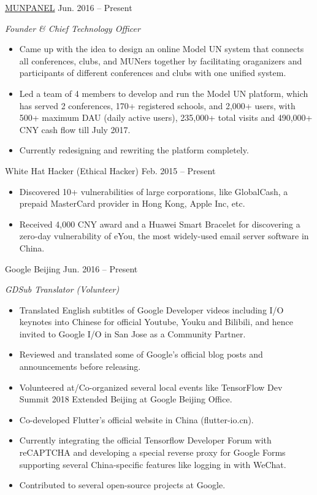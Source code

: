 \documentclass[hidelinks__VERSION__]{adamyi-cv}
\begin{document}
\begin{entrylist}


\entry
{\href{https://www.munpanel.com}{MUNPANEL}}
{Jun. 2016 -- Present}
{\emph{Founder \& Chief Technology Officer}
\begin{itemize}
\item Came up with the idea to design an online Model UN system that connects all conferences, clubs, and MUNers together by facilitating oraganizers and participants of different conferences and clubs with one unified system.
\item Led a team of 4 members to develop and run the Model UN platform, which has served 2 conferences, 170+ registered schools, and 2,000+ users, with 500+ maximum DAU (daily active users), 235,000+ total visits and 490,000+ CNY cash flow till July 2017.
\item Currently redesigning and rewriting the platform completely.
\end{itemize}}


\entry
{White Hat Hacker (Ethical Hacker)}
{Feb. 2015 -- Present}
{\begin{itemize}
\item Discovered 10+ vulnerabilities of large corporations, like GlobalCash, a prepaid MasterCard provider in Hong Kong, Apple Inc, etc.
\item Received 4,000 CNY award and a Huawei Smart Bracelet for discovering a zero-day vulnerability of eYou, the most widely-used email server software in China.
\end{itemize}}


\entry
{Google Beijing}
{Jun. 2016 -- Present}
{\emph{GDSub Translator (Volunteer)}
\begin{itemize}
\item Translated English subtitles of Google Developer videos including I/O keynotes into Chinese for official Youtube, Youku and Bilibili, and hence invited to Google I/O in San Jose as a Community Partner.
\item Reviewed and translated some of Google's official blog posts and announcements before releasing.
\item Volunteered at/Co-organized several local events like TensorFlow Dev Summit 2018 Extended Beijing at Google Beijing Office.
\item Co-developed Flutter's official website in China (flutter-io.cn).
\item Currently integrating the official Tensorflow Developer Forum with reCAPTCHA and developing a special reverse proxy for Google Forms supporting several China-specific features like logging in with WeChat.
\item Contributed to several open-source projects at Google.
\end{itemize}}


\end{entrylist}
\end{document}
